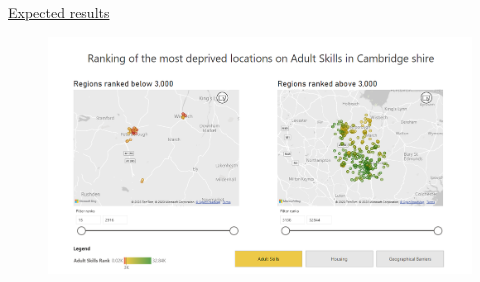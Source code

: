 \documentclass[11pt]{article}
\begin{document}
\clearpage

\underline{Expected results}

\begin{figure}[h!]
    \centering
    \includegraphics[width=\linewidth]{img/practicalmap.png}
\end{figure}
\end{document}
